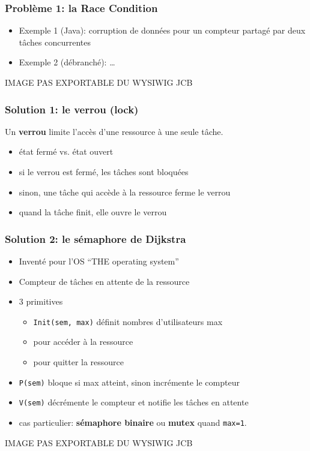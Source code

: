 \documentclass{beamer}
\begin{document}
\begin{frame} 
  \frametitle{Problème 1: la \textbf{Race Condition}}
  \begin{minipage}{.5\linewidth}
    \begin{itemize}
    \item Exemple 1 (Java): corruption de données pour un compteur partagé par
      deux tâches concurrentes
    \item Exemple 2 (débranché): \ldots
    \end{itemize}
  \end{minipage}
  \begin{minipage}{.5\linewidth}
    IMAGE PAS EXPORTABLE DU WYSIWIG JCB
  \end{minipage}
\end{frame} %
\begin{frame}
  \frametitle{Solution 1: le \textbf{verrou} (lock)}
  Un \textbf{verrou} limite l'accès d'une ressource à une seule tâche.
  \begin{itemize}
  \item état fermé vs. état ouvert
  \item si le verrou est fermé, les tâches sont bloquées
  \item sinon, une tâche qui accède à la ressource ferme le verrou
  \item quand la tâche finit, elle ouvre le verrou
  \end{itemize}
\end{frame} %
\begin{frame}
  \frametitle{Solution 2: le \textbf{sémaphore} de Dijkstra}
  \begin{minipage}{.8\linewidth}
    \begin{itemize}
    \item Inventé pour l'OS ``THE operating system''
    \item Compteur de tâches en attente de la ressource
    \item 3 primitives
      \begin{itemize}
      \item \texttt{Init(sem, max)} définit nombres d'utilisateurs max
      \item {} pour accéder à la ressource
      \item {} pour quitter la ressource
      \end{itemize}
    \item \texttt{P(sem)} bloque si max atteint, sinon incrémente le compteur
    \item \texttt{V(sem)} décrémente le compteur et notifie les tâches en
      attente
    \item cas particulier: \textbf{sémaphore binaire} ou \textbf{mutex} quand \texttt{max=1}.
    \end{itemize}
  \end{minipage}
  \begin{minipage}{.3\linewidth}
    IMAGE PAS EXPORTABLE DU WYSIWIG JCB
  \end{minipage}
\end{frame} %
\end{document}
